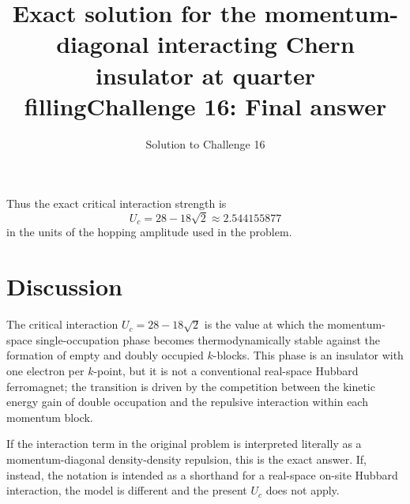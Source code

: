 \documentclass[11pt,a4paper]{article}
\title{Exact solution for the momentum-diagonal interacting Chern insulator at quarter filling}
\author{Solution to Challenge 16}
\date{}
\title{Challenge 16: Final answer}
\author{}
\begin{document}
\maketitle
Thus the exact critical interaction strength is
\begin{equation}
\boxed{
U_c = 28 - 18\sqrt2 \approx 2.544155877
}
\end{equation}
in the units of the hopping amplitude used in the problem.

\section{Discussion}

The critical interaction \(U_c=28-18\sqrt2\) is the value at which the momentum-space single-occupation phase becomes thermodynamically stable against the formation of empty and doubly occupied \(k\)-blocks. This phase is an insulator with one electron per \(k\)-point, but it is not a conventional real-space Hubbard ferromagnet; the transition is driven by the competition between the kinetic energy gain of double occupation and the repulsive interaction within each momentum block.

If the interaction term in the original problem is interpreted literally as a momentum-diagonal density-density repulsion, this is the exact answer. If, instead, the notation is intended as a shorthand for a real-space on-site Hubbard interaction, the model is different and the present \(U_c\) does not apply.
\end{document}
